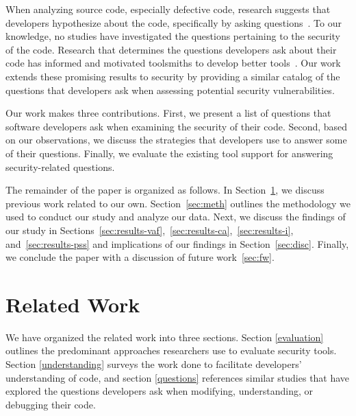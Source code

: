 \documentclass[conference]{IEEEtran}
\begin{document}
When analyzing source code, especially defective code, research suggests that developers hypothesize about the code, specifically by asking questions~\cite{livshits2005finding, ko2004designing}.
To our knowledge, no studies have investigated the questions pertaining to the security of the code. 
Research that determines the questions developers ask about their code has informed and motivated toolsmiths to develop better tools~\cite{kononenko2012automatically, servant2012history, yoon2013visualization}.
Our work extends these promising results to security by providing a similar catalog of the questions that developers ask when assessing potential security vulnerabilities.


Our work makes three contributions. 
First, we present a list of questions that software developers ask when examining the security of their code.
Second, based on our observations, we discuss the strategies that developers use to answer some of their questions.
Finally, we evaluate the existing tool support for answering security-related questions.

The remainder of the paper is organized as follows. 
In Section~\ref{sec:rw}, we discuss previous work related to our own. 
Section~\ref{sec:meth} outlines the methodology we used to conduct our study and analyze our data. 
Next, we discuss the findings of our study in Sections~\ref{sec:results-vaf},~\ref{sec:results-ca},~\ref{sec:results-i}, and~\ref{sec:results-pss} and implications of our findings in Section~\ref{sec:disc}.
Finally, we conclude the paper with a discussion of future work~\ref{sec:fw}.







\section{Related Work}
\label{sec:rw}

We have organized the related work into three sections. Section \ref{evaluation} outlines the predominant approaches researchers use to evaluate security tools. 
Section \ref{understanding} surveys the work done to facilitate developers' understanding of code, and section \ref{questions} references similar studies that have explored the questions developers ask when modifying, understanding, or debugging their code.
\end{document}
